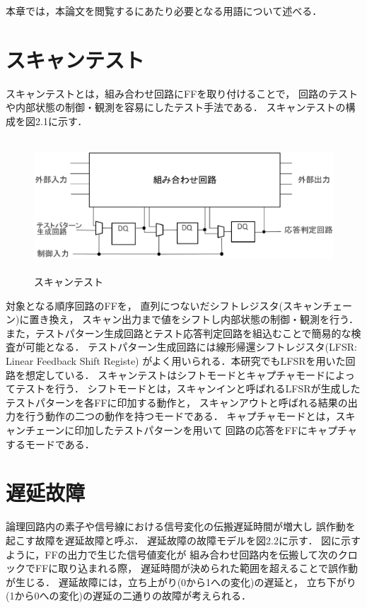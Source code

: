 本章では，本論文を閲覧するにあたり必要となる用語について述べる．

\section{スキャンテスト}
スキャンテスト\cite{scantest}とは，組み合わせ回路にFFを取り付けることで，
回路のテストや内部状態の制御・観測を容易にしたテスト手法である．
スキャンテストの構成を図2.1に示す．
\begin{figure}[]
	\begin{center}
		\includegraphics[height=50mm]{scantest.eps}
		\caption{スキャンテスト}
	\end{center}
\end{figure}

対象となる順序回路のFFを，
直列につないだシフトレジスタ(スキャンチェーン)に置き換え，
スキャン出力まで値をシフトし内部状態の制御・観測を行う．
また，テストパターン生成回路とテスト応答判定回路を組込むことで簡易的な検査が可能となる．
テストパターン生成回路には線形帰還シフトレジスタ(LFSR: Linear Feedback Shift Registe)
がよく用いられる．本研究でもLFSRを用いた回路を想定している．
スキャンテストはシフトモードとキャプチャモードによってテストを行う．
シフトモードとは，スキャンインと呼ばれるLFSRが生成したテストパターンを各FFに印加する動作と，
スキャンアウトと呼ばれる結果の出力を行う動作の二つの動作を持つモードである．
キャプチャモードとは，スキャンチェーンに印加したテストパターンを用いて
回路の応答をFFにキャプチャするモードである．

\section{遅延故障}
論理回路内の素子や信号線における信号変化の伝搬遅延時間が増大し
誤作動を起こす故障を遅延故障\cite{transfault}と呼ぶ．
遅延故障の故障モデルを図2.2に示す．
図に示すように，FFの出力で生じた信号値変化が
組み合わせ回路内を伝搬して次のクロックでFFに取り込まれる際，
遅延時間が決められた範囲を超えることで誤作動が生じる．
遅延故障には，立ち上がり(0から1への変化)の遅延と，
立ち下がり(1から0への変化)の遅延の二通りの故障が考えられる．

